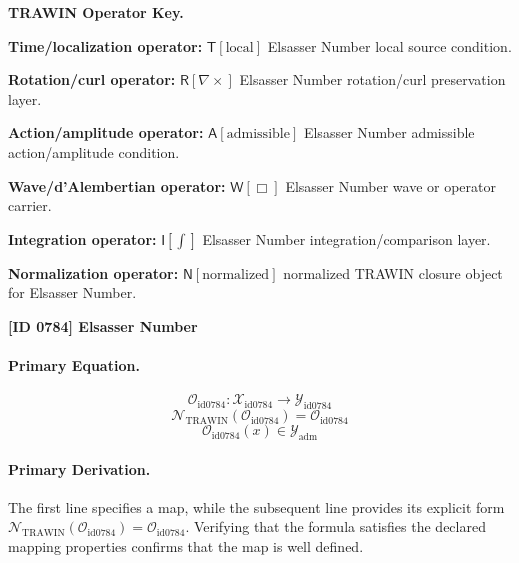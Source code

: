 \par\vspace{0.45\baselineskip}
\noindent\begin{minipage}[t]{\linewidth}
\begingroup
\small
\raggedright
\textbf{TRAWIN Operator Key.}\par
\noindent\textbf{Time/localization operator:} $\mathsf{T}\!\left[\mathrm{local}\right]$ Elsasser Number local source condition.\par
\noindent\textbf{Rotation/curl operator:} $\mathsf{R}\!\left[\nabla\times\right]$ Elsasser Number rotation/curl preservation layer.\par
\noindent\textbf{Action/amplitude operator:} $\mathsf{A}\!\left[\mathrm{admissible}\right]$ Elsasser Number admissible action/amplitude condition.\par
\noindent\textbf{Wave/d'Alembertian operator:} $\mathsf{W}\!\left[\Box\right]$ Elsasser Number wave or operator carrier.\par
\noindent\textbf{Integration operator:} $\mathsf{I}\!\left[\int\right]$ Elsasser Number integration/comparison layer.\par
\noindent\textbf{Normalization operator:} $\mathsf{N}\!\left[\mathrm{normalized}\right]$ normalized TRAWIN closure object for Elsasser Number.\par
\endgroup
\end{minipage}

\clearpage
\noindent\textbf{[ID 0784] Elsasser Number}\par
\vspace{0.35em}
\paragraph{Primary Equation.}
\[
\mathcal{O}_{\mathrm{id0784}}:\mathcal{X}_{\mathrm{id0784}}\longrightarrow\mathcal{Y}_{\mathrm{id0784}}
\]
\[
\mathcal{N}_{\mathrm{TRAWIN}}(\mathcal{O}_{\mathrm{id0784}})=\mathcal{O}_{\mathrm{id0784}}
\]
\[
\mathcal{O}_{\mathrm{id0784}}(x)\in\mathcal{Y}_{\mathrm{adm}}
\]

\paragraph{Primary Derivation.}
The first line specifies a map, while the subsequent line provides its explicit form \( \mathcal{N}_{\mathrm{TRAWIN}}(\mathcal{O}_{\mathrm{id0784}})=\mathcal{O}_{\mathrm{id0784}} \). Verifying that the formula satisfies the declared mapping properties confirms that the map is well defined.
